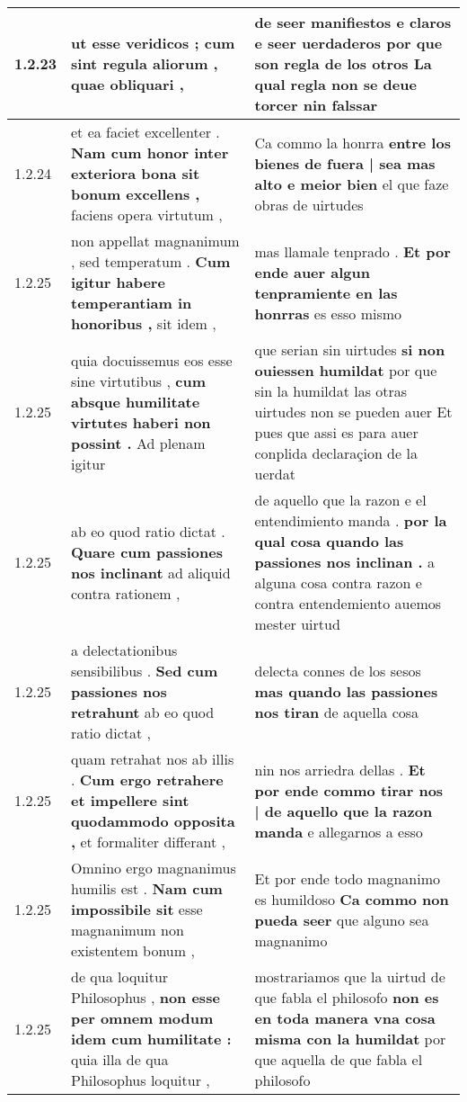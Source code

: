 \begin{tabular}{|p{1cm}|p{6.5cm}|p{6.5cm}|}
1.2.23 & ut esse veridicos ; \textbf{ cum sint regula aliorum , } quae obliquari , & de seer manifiestos e claros e seer uerdaderos \textbf{ por que son regla de los otros } La qual regla non se deue torcer nin falssar \\\hline
1.2.24 & et ea faciet excellenter . \textbf{ Nam cum honor inter exteriora bona sit bonum excellens , } faciens opera virtutum , & Ca commo la honrra \textbf{ entre los bienes de fuera | sea mas alto e meior bien } el que faze obras de uirtudes \\\hline
1.2.25 & non appellat magnanimum , sed temperatum . \textbf{ Cum igitur habere temperantiam in honoribus , } sit idem , & mas llamale tenprado . \textbf{ Et por ende auer algun tenpramiente en las honrras } es esso mismo \\\hline
1.2.25 & quia docuissemus eos esse sine virtutibus , \textbf{ cum absque humilitate virtutes haberi non possint . } Ad plenam igitur & que serian sin uirtudes \textbf{ si non ouiessen humildat } por que sin la humildat las otras uirtudes non se pueden auer Et pues que assi es para auer conplida declaraçion de la uerdat \\\hline
1.2.25 & ab eo quod ratio dictat . \textbf{ Quare cum passiones nos inclinant } ad aliquid contra rationem , & de aquello que la razon e el entendimiento manda . \textbf{ por la qual cosa quando las passiones nos inclinan . } a alguna cosa contra razon e contra entendemiento auemos mester uirtud \\\hline
1.2.25 & a delectationibus sensibilibus . \textbf{ Sed cum passiones nos retrahunt } ab eo quod ratio dictat , & delecta connes de los sesos \textbf{ mas quando las passiones nos tiran } de aquella cosa \\\hline
1.2.25 & quam retrahat nos ab illis . \textbf{ Cum ergo retrahere et impellere sint quodammodo opposita , } et formaliter differant , & nin nos arriedra dellas . \textbf{ Et por ende commo tirar nos | de aquello que la razon manda } e allegarnos a esso \\\hline
1.2.25 & Omnino ergo magnanimus humilis est . \textbf{ Nam cum impossibile sit } esse magnanimum non existentem bonum , & Et por ende todo magnanimo es humildoso \textbf{ Ca commo non pueda seer } que alguno sea magnanimo \\\hline
1.2.25 & de qua loquitur Philosophus , \textbf{ non esse per omnem modum idem cum humilitate : } quia illa de qua Philosophus loquitur , & mostrariamos que la uirtud de que fabla el philosofo \textbf{ non es en toda manera vna cosa misma con la humildat } por que aquella de que fabla el philosofo \\\hline

\end{tabular}
